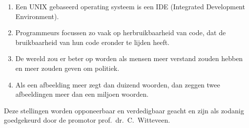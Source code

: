 \documentclass[print,nativefonts]{dissertation}
\begin{document}
{\begin{enumerate}[1.]
	\item Een UNIX gebaseerd operating systeem is een IDE (Integrated Development Environment).

	\item Programmeurs focussen zo vaak op herbruikbaarheid van code, dat de bruikbaarheid van hun code eronder te lijden heeft.

	\item De wereld zou er beter op worden als mensen meer verstand zouden hebben en meer zouden geven om politiek.

	\item Als een afbeelding meer zegt dan duizend woorden, dan zeggen twee afbeeldingen meer dan een miljoen woorden. 
\end{enumerate}

\bigskip
\bigskip

\begin{center}
Deze stellingen worden opponeerbaar en verdedigbaar geacht en zijn als zodanig goedgekeurd door de promotor prof.\ dr.\ C.\ Witteveen.
\end{center}

}
\end{document}
